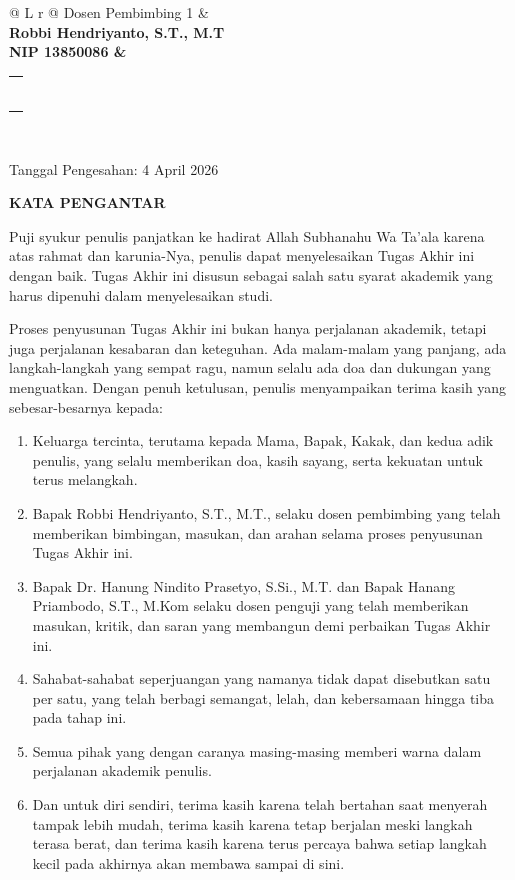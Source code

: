 \vspace{1.5cm}

\noindent
\begin{tabularx}{\textwidth}{@{} L r @{}}
    Dosen Pembimbing 1 & \\
    \bfseries Robbi Hendriyanto, S.T., M.T \\ NIP 13850086 & \begin{tabular}[t]{c} \\[0cm] \rule{6.5cm}{0.4pt} \end{tabular} \\ 
\end{tabularx}

\vfill

\noindent
Tanggal Pengesahan: 4 April 2026

\newpage
\begin{center}
    {\large\bfseries KATA PENGANTAR \par}
\end{center}
\vspace{0.5cm}

Puji syukur penulis panjatkan ke hadirat Allah Subhanahu Wa Ta'ala karena atas rahmat dan karunia-Nya, penulis dapat menyelesaikan Tugas Akhir ini dengan baik. Tugas Akhir ini disusun sebagai salah satu syarat akademik yang harus dipenuhi dalam menyelesaikan studi.

Proses penyusunan Tugas Akhir ini bukan hanya perjalanan akademik, tetapi juga perjalanan kesabaran dan keteguhan. Ada malam-malam yang panjang, ada langkah-langkah yang sempat ragu, namun selalu ada doa dan dukungan yang menguatkan. Dengan penuh ketulusan, penulis menyampaikan terima kasih yang sebesar-besarnya kepada:

\begin{enumerate}
    \item Keluarga tercinta, terutama kepada Mama, Bapak, Kakak, dan kedua adik penulis, yang selalu memberikan doa, kasih sayang, serta kekuatan untuk terus melangkah.
    \item Bapak Robbi Hendriyanto, S.T., M.T., selaku dosen pembimbing yang telah memberikan bimbingan, masukan, dan arahan selama proses penyusunan Tugas Akhir ini.
    \item Bapak Dr. Hanung Nindito Prasetyo, S.Si., M.T. dan Bapak Hanang Priambodo, S.T., M.Kom selaku dosen penguji yang telah memberikan masukan, kritik, dan saran yang membangun demi perbaikan Tugas Akhir ini.
    \item Sahabat-sahabat seperjuangan yang namanya tidak dapat disebutkan satu per satu, yang telah berbagi semangat, lelah, dan kebersamaan hingga tiba pada tahap ini.
    \item Semua pihak yang dengan caranya masing-masing memberi warna dalam perjalanan akademik penulis.
    \item Dan untuk diri sendiri, terima kasih karena telah bertahan saat menyerah tampak lebih mudah, terima kasih karena tetap berjalan meski langkah terasa berat, dan terima kasih karena terus percaya bahwa setiap langkah kecil pada akhirnya akan membawa sampai di sini.
\end{enumerate}

